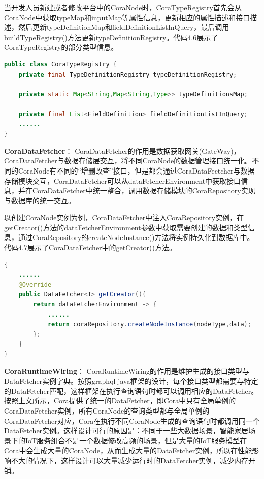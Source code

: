 \documentclass[winfonts,master,twoside]{njuthesis}
\begin{document}
当开发人员新建或者修改平台中的CoraNode时，CoraTypeRegistry首先会从CoraNode中获取typeMap和inputMap等属性信息，更新相应的属性描述和接口描述，然后更新typeDefinitionMap和fieldDefinitionListInQuery，最后调用buildTypeRegistry()方法更新typeDefinitionRegistry。代码4.6展示了CoraTypeRegistry的部分类型信息。
\begin{lstlisting}[caption={CoraTypeRegistry类型信息},label={lst:CoraTypeRegistry},language=java,basicstyle=\footnotesize]
public class CoraTypeRegistry {
    private final TypeDefinitionRegistry typeDefinitionRegistry;    
    
    private static Map<String,Map<String,Type>> typeDefinitionsMap; 
    
    private final List<FieldDefinition> fieldDefinitionListInQuery;              
    ......
}
\end{lstlisting}

\textbf{CoraDataFetcher}：
CoraDataFetcher的作用是数据获取网关(GateWay)，CoraDataFetcher与数据存储层交互，将不同CoraNode的数据管理接口统一化。不同的CoraNode有不同的“增删改查”接口，但是都会通过CoraDataFectcher与数据存储模块交互，CoraDataFetcher可以从dataFetcherEnvironment中获取接口信息，并在CoraDataFetcher中统一整合，调用数据存储模块的CoraRepository实现与数据库的统一交互。

以创建CoraNode实例为例，CoraDataFetcher中注入CoraRepository实例，在getCreator()方法的dataFetcherEnvironment参数中获取需要创建的数据和类型信息，通过CoraRepository的createNodeInstance()方法将实例持久化到数据库中。代码4.7展示了CoraDataFetcher中的getCreator()方法。
\begin{lstlisting}[caption={CoraDataFetcher中的getCreator()方法},label={lst:getCreator()},language=java,basicstyle=\footnotesize]
{
    ......
    @Override
    public DataFetcher<T> getCreator(){
        return dataFetcherEnvironment -> {
            ......
            return coraRepository.createNodeInstance(nodeType,data);
        };
    }
}
\end{lstlisting}

\textbf{CoraRuntimeWiring}：
CoraRuntimeWiring的作用是维护生成的接口类型与DataFetcher实例字典。按照graphql-java框架的设计，每个接口类型都需要与特定的DataFetcher匹配，这样框架在执行查询语句时都可以调用相应的DataFetcher。按照上文所示，Cora提供了统一的DataFetcher，即Cora中只有全局单例的CoraDataFetcher实例，所有CoraNode的查询类型都与全局单例的CoraDataFetcher对应，Cora在执行不同CoraNode生成的查询语句时都调用同一个DataFetcher实例。这样设计可行的原因是：不同于一些大数据场景，智能家居场景下的IoT服务组合不是一个数据修改高频的场景，但是大量的IoT服务模型在Cora中会生成大量的CoraNode，从而生成大量的DataFetcher实例，所以在性能影响不大的情况下，这样设计可以大量减少运行时的DataFetcher实例，减少内存开销。
\end{document}
